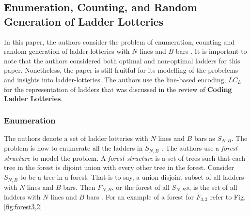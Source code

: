 \subsection{Enumeration, Counting, and Random Generation of Ladder Lotteries}

In this paper, the authors consider the problem of enumeration, counting and 
random generation of ladder-lotteries with $N$ lines and $B$ bars \cite{A6}. 
It is important to note that the authors considered both optimal and 
non-optimal ladders for this paper. Nonetheless, the paper is still fruitful 
for its modelling of the probelems and insights into ladder-lotteries.
The authors use  the line-based encoding, $LC_{L}$ for the representation of ladders 
that was discussed in the review of \textbf{Coding Ladder Lotteries}.

\subsubsection{Enumeration}
The authors denote a set of ladder lotteries with $N$ lines and 
$B$ bars as $S_{N,B}$. The problem is how to enumerate all the 
ladders in $S_{N,B}$ \cite{A6}. The authors use a \emph{forest structure}
to model the problem. A \emph{forest structure} is a set of trees 
such that each tree in the forest is dijoint union with every other 
tree in the forest. Consider $S_{N,B}$ to be a tree in a forest.
That is to say, a union disjoint subset of all ladders with $N$
lines and $B$ bars. Then $F_{N,B}$, or the forest of all $S_{N,B}s$,
is the set of all ladders with $N$ lines and $B$ bars \cite{A6}. For an example 
of a forest for $F_{3,2}$ refer to Fig. \ref{fig:forest3,2}\par %

